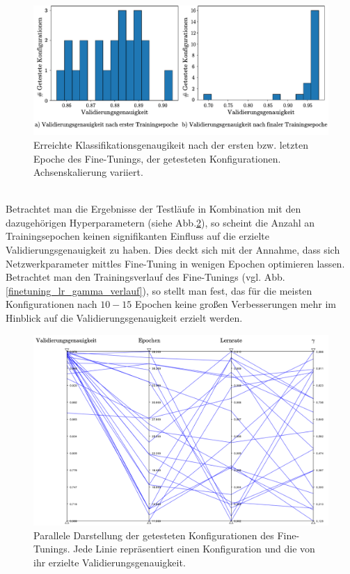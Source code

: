 \begin{figure}[h]
\includegraphics[scale=0.750]{NNOPT/init_and_end_perf_finetuning.pdf}
\caption{Erreichte Klassifikationsgenaugikeit nach der ersten bzw. letzten Epoche des Fine-Tunings, der getesteten Konfigurationen. Achsenskalierung variiert.}
\label{finetuning_int_end}
\end{figure}
\\
Betrachtet man die Ergebnisse der Testläufe in Kombination mit den dazugehörigen Hyperparametern (siehe Abb.\ref{finetuning_all}), so scheint die Anzahl an Trainingsepochen keinen signifikanten Einfluss auf die erzielte Validierungsgenauigkeit zu haben. Dies deckt sich mit der Annahme, dass sich Netzwerkparameter mittles Fine-Tuning in wenigen Epochen optimieren lassen. Betrachtet man den Trainingsverlauf des Fine-Tunings (vgl. Abb. \ref{finetuning_lr_gamma_verlauf}), so stellt man fest, das für die meisten Konfigurationen nach $10-15$ Epochen keine großen Verbesserungen mehr im Hinblick auf die Validierungsgenauigkeit erzielt werden.  
\begin{figure}[h]
\includegraphics[scale=0.58]{NNOPT/finetuning_all.pdf}
\caption{Parallele Darstellung der getesteten Konfigurationen des Fine-Tunings. Jede Linie repräsentiert einen Konfiguration und die von ihr erzielte Validierungsgenauigkeit.}
\label{finetuning_all}
\end{figure}
